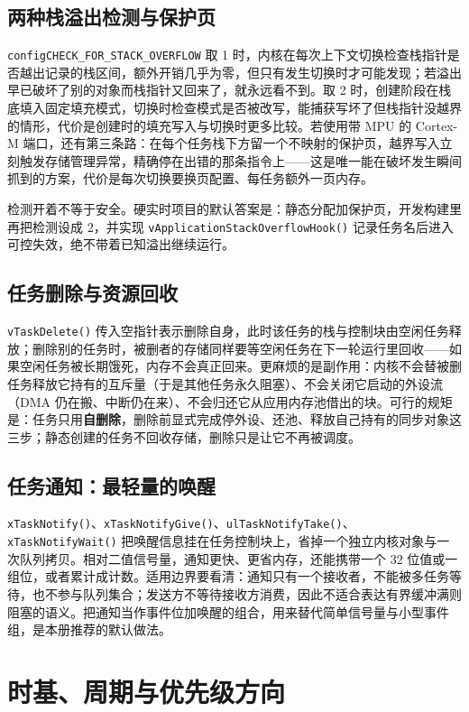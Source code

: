 \documentclass[12pt,a4paper,fontset=fandol]{ctexbook}
\newcommand{\Fn}[1]{\texttt{#1()}}
\newcommand{\Tp}[1]{\texttt{#1}}
\begin{document}
\subsection{两种栈溢出检测与保护页}

\Tp{configCHECK\_FOR\_STACK\_OVERFLOW} 取 1 时，内核在每次上下文切换检查栈指针是否越出记录的栈区间，额外开销几乎为零，但只有发生切换时才可能发现；若溢出早已破坏了别的对象而栈指针又回来了，就永远看不到。取 2 时，创建阶段在栈底填入固定填充模式，切换时检查模式是否被改写，能捕获写坏了但栈指针没越界的情形，代价是创建时的填充写入与切换时更多比较。若使用带 MPU 的 Cortex-M 端口，还有第三条路：在每个任务栈下方留一个不映射的保护页，越界写入立刻触发存储管理异常，精确停在出错的那条指令上——这是唯一能在破坏发生瞬间抓到的方案，代价是每次切换要换页配置、每任务额外一页内存。

检测开着不等于安全。硬实时项目的默认答案是：静态分配加保护页，开发构建里再把检测设成 2，并实现 \Fn{vApplicationStackOverflowHook} 记录任务名后进入可控失效，绝不带着已知溢出继续运行。

\subsection{任务删除与资源回收}

\Fn{vTaskDelete} 传入空指针表示删除自身，此时该任务的栈与控制块由空闲任务释放；删除别的任务时，被删者的存储同样要等空闲任务在下一轮运行里回收——如果空闲任务被长期饿死，内存不会真正回来。更麻烦的是副作用：内核不会替被删任务释放它持有的互斥量（于是其他任务永久阻塞）、不会关闭它启动的外设流（DMA 仍在搬、中断仍在来）、不会归还它从应用内存池借出的块。可行的规矩是：任务只用\textbf{自删除}，删除前显式完成停外设、还池、释放自己持有的同步对象这三步；静态创建的任务不回收存储，删除只是让它不再被调度。

\subsection{任务通知：最轻量的唤醒}

\Fn{xTaskNotify}、\Fn{xTaskNotifyGive}、\Fn{ulTaskNotifyTake}、\Fn{xTaskNotifyWait} 把唤醒信息挂在任务控制块上，省掉一个独立内核对象与一次队列拷贝。相对二值信号量，通知更快、更省内存，还能携带一个 32 位值或一组位，或者累计成计数。适用边界要看清：通知只有一个接收者，不能被多任务等待，也不参与队列集合；发送方不等待接收方消费，因此不适合表达有界缓冲满则阻塞的语义。把通知当作事件位加唤醒的组合，用来替代简单信号量与小型事件组，是本册推荐的默认做法。

\section{时基、周期与优先级方向}
\end{document}
